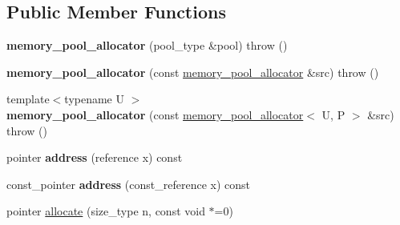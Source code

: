 \subsection*{Public Member Functions}
\begin{DoxyCompactItemize}
\item 
\hypertarget{classtbb_1_1interface6_1_1memory__pool__allocator_a384be31e682a3b86b5b11e635232c9c5}{}{\bfseries memory\+\_\+pool\+\_\+allocator} (pool\+\_\+type \&pool)  throw ()\label{classtbb_1_1interface6_1_1memory__pool__allocator_a384be31e682a3b86b5b11e635232c9c5}

\item 
\hypertarget{classtbb_1_1interface6_1_1memory__pool__allocator_aa2b4cf16b566e40ddb196c371e5ae96e}{}{\bfseries memory\+\_\+pool\+\_\+allocator} (const \hyperlink{classtbb_1_1interface6_1_1memory__pool__allocator}{memory\+\_\+pool\+\_\+allocator} \&src)  throw ()\label{classtbb_1_1interface6_1_1memory__pool__allocator_aa2b4cf16b566e40ddb196c371e5ae96e}

\item 
\hypertarget{classtbb_1_1interface6_1_1memory__pool__allocator_ad32ad8245399fbdb38a0a41e912d86d9}{}{\footnotesize template$<$typename U $>$ }\\{\bfseries memory\+\_\+pool\+\_\+allocator} (const \hyperlink{classtbb_1_1interface6_1_1memory__pool__allocator}{memory\+\_\+pool\+\_\+allocator}$<$ U, P $>$ \&src)  throw ()\label{classtbb_1_1interface6_1_1memory__pool__allocator_ad32ad8245399fbdb38a0a41e912d86d9}

\item 
\hypertarget{classtbb_1_1interface6_1_1memory__pool__allocator_a55653a8c539901be6ca24a120a5d7b72}{}pointer {\bfseries address} (reference x) const \label{classtbb_1_1interface6_1_1memory__pool__allocator_a55653a8c539901be6ca24a120a5d7b72}

\item 
\hypertarget{classtbb_1_1interface6_1_1memory__pool__allocator_a8a3e4236f6e1266f126dac557906ce2c}{}const\+\_\+pointer {\bfseries address} (const\+\_\+reference x) const \label{classtbb_1_1interface6_1_1memory__pool__allocator_a8a3e4236f6e1266f126dac557906ce2c}

\item 
\hypertarget{classtbb_1_1interface6_1_1memory__pool__allocator_a10b9888883a3dbd66e87c4a7f874ef28}{}pointer \hyperlink{classtbb_1_1interface6_1_1memory__pool__allocator_a10b9888883a3dbd66e87c4a7f874ef28}{allocate} (size\+\_\+type n, const void $\ast$=0)\label{classtbb_1_1interface6_1_1memory__pool__allocator_a10b9888883a3dbd66e87c4a7f874ef28}


\end{DoxyCompactItemize}
